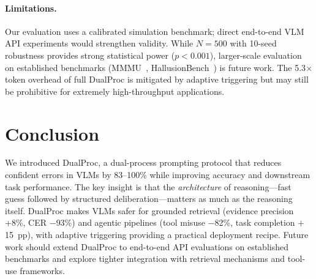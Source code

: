\documentclass[10pt,twocolumn,letterpaper]{article}
\newcommand{\method}{DualProc}
\begin{document}
\paragraph{Limitations.}
Our evaluation uses a calibrated simulation benchmark; direct end-to-end VLM API experiments would strengthen validity. While $N\!=\!500$ with 10-seed robustness provides strong statistical power ($p\!<\!0.001$), larger-scale evaluation on established benchmarks (MMMU~\cite{yue2024mmmu}, HallusionBench~\cite{guan2024hallusionbench}) is future work. The 5.3$\times$ token overhead of full \method{} is mitigated by adaptive triggering but may still be prohibitive for extremely high-throughput applications.


\section{Conclusion}

We introduced \method{}, a dual-process prompting protocol that reduces confident errors in VLMs by 83--100\% while improving accuracy and downstream task performance.
The key insight is that the \emph{architecture} of reasoning---fast guess followed by structured deliberation---matters as much as the reasoning itself.
\method{} makes VLMs safer for grounded retrieval (evidence precision +8\%, CER $-$93\%) and agentic pipelines (tool misuse $-$82\%, task completion $+$15~pp), with adaptive triggering providing a practical deployment recipe.
Future work should extend \method{} to end-to-end API evaluations on established benchmarks and explore tighter integration with retrieval mechanisms and tool-use frameworks.

{\small


}
\end{document}
